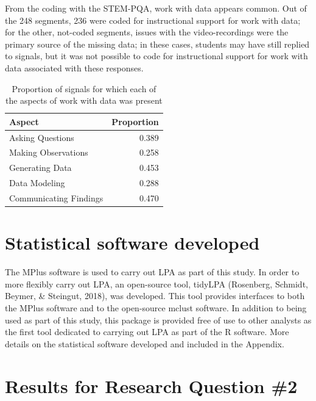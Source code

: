 \documentclass[]{msu-thesis}
\theoremstyle{definition}
\theoremstyle{definition}
\theoremstyle{definition}
\theoremstyle{remark}
\begin{document}
From the coding with the STEM-PQA, work with data appears common. Out of
the 248 segments, 236 were coded for instructional support for work with
data; for the other, not-coded segments, issues with the
video-recordings were the primary source of the missing data; in these
cases, students may have still replied to signals, but it was not
possible to code for instructional support for work with data associated
with these responses.

\begin{table}

\caption{\label{tab:unnamed-chunk-11}Proportion of signals for which each of the aspects of work with data was present}
\centering
\begin{tabular}[t]{lr}
\toprule
Aspect & Proportion\\
\midrule
Asking Questions & 0.389\\
Making Observations & 0.258\\
Generating Data & 0.453\\
Data Modeling & 0.288\\
Communicating Findings & 0.470\\
\bottomrule
\end{tabular}
\end{table}

\section{Statistical software
developed}\label{statistical-software-developed}

The MPlus software is used to carry out LPA as part of this study. In
order to more flexibly carry out LPA, an open-source tool, tidyLPA
(Rosenberg, Schmidt, Beymer, \& Steingut, 2018), was developed. This
tool provides interfaces to both the MPlus software and to the
open-source mclust software. In addition to being used as part of this
study, this package is provided free of use to other analysts as the
first tool dedicated to carrying out LPA as part of the R software. More
details on the statistical software developed and included in the
Appendix.

\section{Results for Research Question
\#2}\label{results-for-research-question-2}
\end{document}
